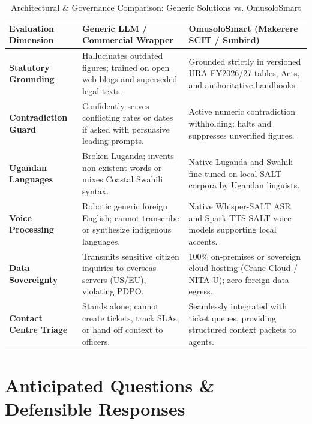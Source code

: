 \documentclass[10pt,a4paper]{article}
\begin{document}
\begin{table}[h!]
\centering
\small
\begin{tabularx}{\textwidth}{l X X}
\toprule
\textbf{Evaluation Dimension} & \textbf{Generic LLM / Commercial Wrapper} & \textbf{OmusoloSmart (Makerere SCIT / Sunbird)} \\
\midrule
\textbf{Statutory Grounding} & Hallucinates outdated figures; trained on open web blogs and superseded legal texts. & Grounded strictly in versioned URA FY2026/27 tables, Acts, and authoritative handbooks. \\
\addlinespace
\textbf{Contradiction Guard} & Confidently serves conflicting rates or dates if asked with persuasive leading prompts. & Active numeric contradiction withholding: halts and suppresses unverified figures. \\
\addlinespace
\textbf{Ugandan Languages} & Broken Luganda; invents non-existent words or mixes Coastal Swahili syntax. & Native Luganda and Swahili fine-tuned on local SALT corpora by Ugandan linguists. \\
\addlinespace
\textbf{Voice Processing} & Robotic generic foreign English; cannot transcribe or synthesize indigenous languages. & Native Whisper-SALT ASR and Spark-TTS-SALT voice models supporting local accents. \\
\addlinespace
\textbf{Data Sovereignty} & Transmits sensitive citizen inquiries to overseas servers (US/EU), violating PDPO. & 100\% on-premises or sovereign cloud hosting (Crane Cloud / NITA-U); zero foreign data egress. \\
\addlinespace
\textbf{Contact Centre Triage} & Stands alone; cannot create tickets, track SLAs, or hand off context to officers. & Seamlessly integrated with ticket queues, providing structured context packets to agents. \\
\bottomrule
\end{tabularx}
\caption{Architectural \& Governance Comparison: Generic Solutions vs. OmusoloSmart}
\end{table}

\section{Anticipated Questions \& Defensible Responses}
\end{document}

